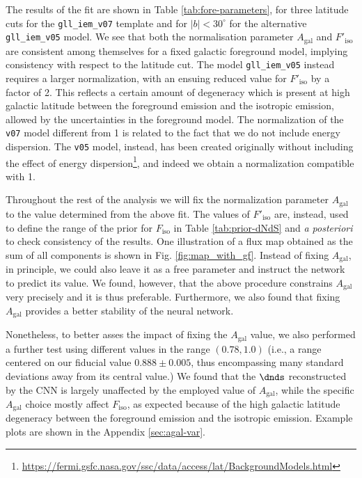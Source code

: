 The results of the fit are shown in Table \ref{tab:fore-parameters}, for three latitude cuts for the \verb|gll_iem_v07| template and for $|b|<30^\circ$ for the alternative \verb|gll_iem_v05| model. We see that both the normalisation parameter $A_\textrm{gal}$ and $F'_\textrm{iso}$ are consistent among themselves for a fixed galactic foreground model, implying consistency with respect to the latitude cut. The model \verb|gll_iem_v05| instead requires a larger normalization, with an ensuing reduced value for $F'_\textrm{iso}$ by a factor of 2.
This reflects a certain amount of degeneracy which is present at high galactic latitude between the foreground emission and the isotropic emission, allowed by the uncertainties in the foreground model.
The normalization of the \verb|v07| model different from 1 is related to the fact that we do not include energy dispersion. The \verb|v05| model, instead, has been created originally without including the effect of energy dispersion\footnote{\url{https://fermi.gsfc.nasa.gov/ssc/data/access/lat/BackgroundModels.html}}, and indeed we obtain a normalization compatible with 1.


Throughout the rest of the analysis we will fix the normalization parameter $A_\textrm{gal}$ to the value determined from the above fit. The values of $F'_\textrm{iso}$ are, instead, used to define the range of the prior for $F_\textrm{iso}$ in Table \ref{tab:prior-dNdS} and \textsl{a posteriori} to check consistency of the results.
%
One illustration of a flux map obtained as the sum of all components is shown in Fig. \ref{fig:map_with_gf}.
Instead of fixing $A_\textrm{gal}$, in principle, we could also leave it as a free parameter and instruct the network to predict its value. We found, however, that the above procedure constrains $A_\textrm{gal}$ very precisely and it is thus preferable. Furthermore, we also found that fixing $A_\textrm{gal}$ provides a better stability of the neural network.  

{  Nonetheless, to better asses the impact of fixing the $A_\textrm{gal}$ value, we also performed a further test using different values in the range $(0.78, 1.0)$ (i.e., a range centered on our fiducial value $0.888 \pm 0.005$, thus encompassing many standard deviations away from its central value.)
We found that the $\dnds$ reconstructed by the CNN is largely unaffected by the employed value of $A_\textrm{gal}$, while 
the specific $A_\textrm{gal}$ choice mostly affect $F_\textrm{iso}$,
as expected because of the  high galactic latitude degeneracy between the foreground emission and the isotropic emission. 
Example plots are shown in the Appendix \ref{sec:agal-var}.}





